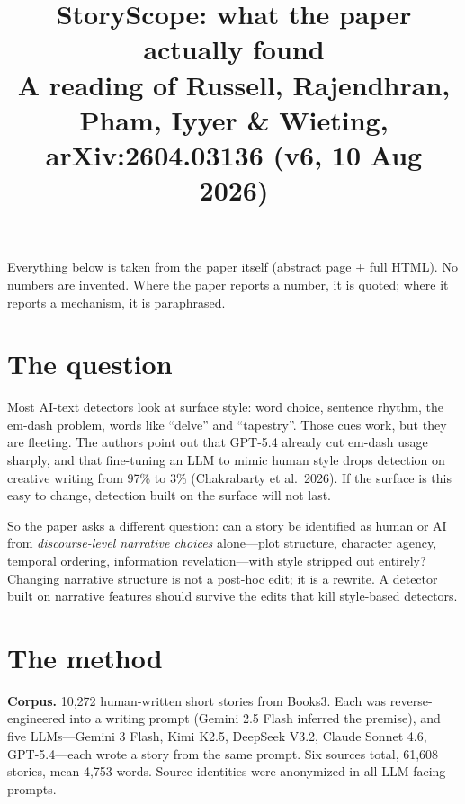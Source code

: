 \documentclass[11pt]{article}
\title{\bfseries StoryScope: what the paper actually found\\[4pt]\large A reading of Russell, Rajendhran, Pham, Iyyer \& Wieting, arXiv:2604.03136 (v6, 10 Aug 2026)}
\author{}
\date{}
\begin{document}
\maketitle
\noindent Everything below is taken from the paper itself (abstract page + full HTML). No numbers are invented. Where the paper reports a number, it is quoted; where it reports a mechanism, it is paraphrased.

\section{The question}
Most AI-text detectors look at surface style: word choice, sentence rhythm, the em-dash problem, words like ``delve'' and ``tapestry''. Those cues work, but they are fleeting. The authors point out that GPT-5.4 already cut em-dash usage sharply, and that fine-tuning an LLM to mimic human style drops detection on creative writing from 97\% to 3\% (Chakrabarty et al.\ 2026). If the surface is this easy to change, detection built on the surface will not last.

So the paper asks a different question: can a story be identified as human or AI from \emph{discourse-level narrative choices} alone---plot structure, character agency, temporal ordering, information revelation---with style stripped out entirely? Changing narrative structure is not a post-hoc edit; it is a rewrite. A detector built on narrative features should survive the edits that kill style-based detectors.

\section{The method}
\textbf{Corpus.} 10,272 human-written short stories from Books3. Each was reverse-engineered into a writing prompt (Gemini 2.5 Flash inferred the premise), and five LLMs---Gemini 3 Flash, Kimi K2.5, DeepSeek V3.2, Claude Sonnet 4.6, GPT-5.4---each wrote a story from the same prompt. Six sources total, 61,608 stories, mean 4,753 words. Source identities were anonymized in all LLM-facing prompts.
\end{document}
